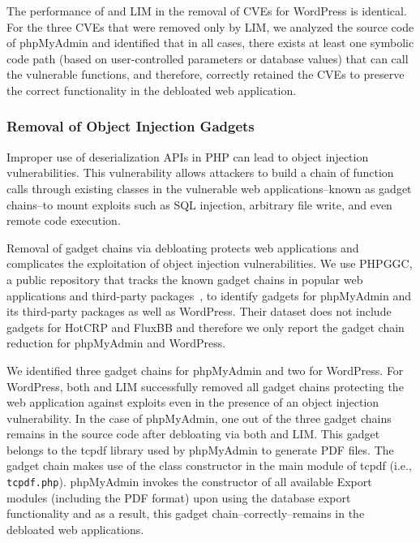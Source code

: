 {The performance of \animatedead{} and LIM in the removal of CVEs for WordPress is identical. 
For the three CVEs that were removed only by LIM, we analyzed the source code of phpMyAdmin and identified that in all cases, there exists at least one symbolic code path (based on user-controlled parameters or database values) that can call the vulnerable functions, and therefore, \animatedead{} correctly retained the CVEs to preserve the correct functionality in the debloated web application. 


\subsubsection*{Removal of Object Injection Gadgets}
Improper use of deserialization APIs in PHP can lead to object injection vulnerabilities. 
This vulnerability allows attackers to build a chain of function calls through existing classes in the vulnerable web applications--known as gadget chains--to mount exploits such as SQL injection, arbitrary file write, and even remote code execution. 

Removal of gadget chains via debloating protects web applications and complicates the exploitation of object injection vulnerabilities. 
We use PHPGGC, a public repository that tracks the known gadget chains in popular web applications and third-party packages~\cite{PHPGGC}, to identify gadgets for phpMyAdmin and its third-party packages as well as WordPress. 
Their dataset does not include gadgets for HotCRP and FluxBB and therefore we only report the gadget chain reduction for phpMyAdmin and WordPress.

We identified three gadget chains for phpMyAdmin and two for WordPress.
For WordPress, both \animatedead{} and LIM successfully removed all gadget chains protecting the web application against exploits even in the presence of an object injection vulnerability. 
In the case of phpMyAdmin, one out of the three gadget chains remains in the source code after debloating via both \animatedead{} and LIM. 
This gadget belongs to the tcpdf library used by phpMyAdmin to generate PDF files. 
The gadget chain makes use of the class constructor in the main module of tcpdf (i.e., \texttt{tcpdf.php}). 
phpMyAdmin invokes the constructor of all available Export modules (including the PDF format) upon using the database export functionality and as a result, this gadget chain--correctly--remains in the debloated web applications.

}
